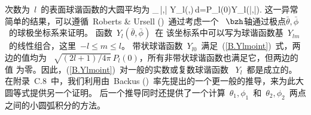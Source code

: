 次数为~$l$~的表面球谐函数的大圆平均为
\eq \label{B.Ylmoint}
\oint_{\,\bar{\theta},\bar{\phi}}
Y_{l}(\theta,\phi)\,d\/\Delta=P_l(0)Y_{l}(\bar{\theta},\bar{\phi}).
\en
这一异常简单的结果，可以遵循~Roberts \& Ursell (\citeyear{roberts&ursell60})~通过考虑一个~
$\bzh$轴通过极点$\bar{\theta},\bar{\phi}$~的球极坐标系来证明。
函数~$Y_l(\bar{\theta},\bar{\phi})$~在
该坐标系中可以写为球谐函数基~$Y_{lm}$~的线性组合，这里~$-l\leq m\leq l$。
带状球谐函数~$Y_{l0}$~满足~(\ref{B.Ylmoint})~式，两边的值均为~
$\sqrt{(2l+1)/4\pi}\,P_l(0)$，所有非带状球谐函数也满足它，但两边的值
为零。因此，(\ref{B.Ylmoint})~对一般的实数或复数球谐函数~ $Y_l$~都是成立的。
在附录~C.8~中，我们利用由~Backus (\citeyear{backus64})~率先提出的一个更一般的推导，来为此大圆等式提供另一个证明。
后一个推导同时还提供了一个计算~$\theta_1,\phi_1$~和~$\theta_2,\phi_2$~两点 之间的小圆弧积分的方法。

